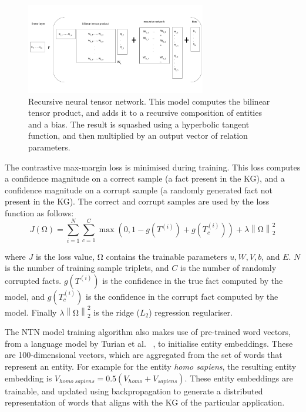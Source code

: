 \begin{figure}[H]
   	\centering
    	\includegraphics[width=0.7\textwidth, height=0.4\textwidth]{recursive_neural_tensor_network.png}
	\captionsetup{justification=centering}
	\caption{Recursive neural tensor network. This model computes the bilinear tensor product, and adds it to a recursive composition of entities and a bias. The result is squashed using a hyperbolic tangent function, and then multiplied by an output vector of relation parameters.}
\end{figure}

\noindent The contrastive max-margin loss is minimised during training. This loss computes a confidence magnitude on a correct sample (a fact present in the KG), and a confidence magnitude on a corrupt sample (a randomly generated fact not present in the KG). The correct and corrupt samples are used by the loss function as follows:
\begin{equation}
	J(\si{\ohm}) =  \sum_{i=1}^N \sum_{c=1}^C \max(0,1 - g(T^{(i)}) + g(T_c^{(i)})) + \lambda \left \lVert \si{\ohm} \right \rVert_2^2
\end{equation}

\noindent where $J$ is the loss value, $\si{\ohm}$ contains the trainable parameters $u, W, V, b $, and $ E $. $N$ is the number of training sample triplets, and $ C $ is the number of randomly corrupted facts. $ g(T^{(i)}) $ is the confidence in the true fact computed by the model, and $ g(T_c^{(i)}) $ is the confidence in the corrupt fact computed by the model. Finally $\lambda\left\lVert \si{\ohm} \right\rVert_2^2$ is the ridge ($L_2$) regression regulariser. \par

\noindent The NTN model training algorithm also makes use of pre-trained word vectors, from a language model by Turian et al. \unskip ~\citep{turian2010word}, to initialise entity embeddings. These are 100-dimensional vectors, which are aggregated from the set of words that represent an entity. For example for the entity \textit{homo sapiens}, the resulting entity embedding is $V_{homo \; sapiens} = 0.5(V_{homo} + V_{sapiens})$. These entity embeddings are trainable, and updated using backpropagation to generate a distributed representation of words that aligns with the KG of the particular application. \par

